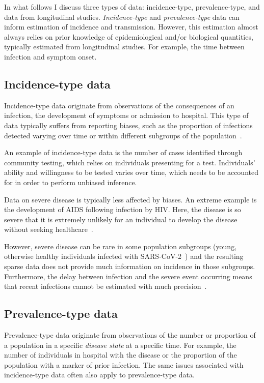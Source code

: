 \documentclass[thesis.tex]{subfiles}
\begin{document}
In what follows I discuss three types of data: incidence-type, prevalence-type, and data from longitudinal studies.
\emph{Incidence-type} and \emph{prevalence-type} data can inform estimation of incidence and transmission.
However, this estimation almost always relies on prior knowledge of epidemiological and/or biological quantities, typically estimated from longitudinal studies.
For example, the time between infection and symptom onset.

\subsection{Incidence-type data}

Incidence-type data originate from observations of the consequences of an infection, \eg the development of symptoms or admission to hospital.
This type of data typically suffers from reporting biases, such as the proportion of infections detected varying over time or within different subgroups of the population~\autocites[chapter 9]{lashModern}{shadboltChallenges}.

An example of incidence-type data is the number of cases identified through community testing, which relies on individuals presenting for a test.
Individuals' ability and willingness to be tested varies over time, which needs to be accounted for in order to perform unbiased inference.

Data on severe disease is typically less affected by biases.
An extreme example is the development of AIDS following infection by HIV.
Here, the disease is so severe that it is extremely unlikely for an individual to develop the disease without seeking healthcare~\autocite{evansCompleteness}.

However, severe disease can be rare in some population subgroups (\eg young, otherwise healthy individuals infected with SARS-CoV-2~\autocite{wardSero,bhopalChildren}) and the resulting sparse data 
 does not provide much information on incidence in those subgroups.
Furthermore, the delay between infection and the severe event occurring means that recent infections cannot be estimated with much precision~\autocite{swallow2022challenges}.

\subsection{Prevalence-type data}

Prevalence-type data originate from observations of the number or proportion of a population in a specific \emph{disease state} at a specific time.
For example, the number of individuals in hospital with the disease or the proportion of the population with a marker of prior infection.
The same issues associated with incidence-type data often also apply to prevalence-type data.
\end{document}
